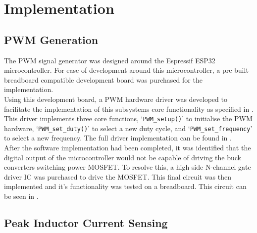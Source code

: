 \chapter{Implementation}\label{C:implementation}


\section{PWM Generation}\label{S:pwm_gen_impl}

The PWM signal generator was designed around the Espressif ESP32 microcontroller. For ease of development around this microcontroller, a pre-built breadboard compatible development board was purchased for the implementation. \\

Using this development board, a PWM hardware driver was developed to facilitate the implementation of this subsystems core functionality as specified in . This driver implements three core functions, `\lstinline{PWM_setup()}' to initialise the PWM hardware, `\lstinline{PWM_set_duty()}' to select a new duty cycle, and `\lstinline{PWM_set_frequency}' to select a new frequency. The full driver implementation can be found in .\\

After the software implementation had been completed, it was identified that the digital output of the microcontroller would not be capable of driving the buck converters switching power MOSFET. To resolve this, a high side N-channel gate driver IC was purchased to drive the MOSFET. This final circuit was then implemented and it's functionality was tested on a breadboard. This circuit can be seen in .



\section{Peak Inductor Current Sensing}\label{S:current_sense_impl}



